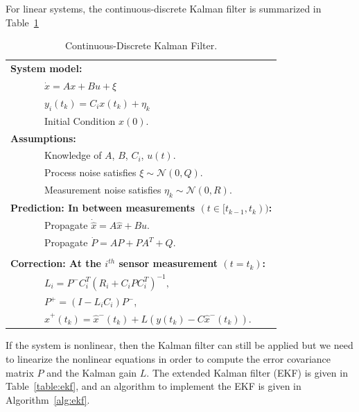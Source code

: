 {For linear systems, the continuous-discrete Kalman filter is
summarized in Table~\ref{table:kf}
\begin{table}[hhhhtb]
\begin{center}
\begin{tabular}{l}
\hline
\textbf{System model:} \\
~~~~~~~$\dot{x}=Ax+Bu + \xi$ \\
~~~~~~~$y_i(t_k)=C_ix(t_k) + \eta_k$ \\
~~~~~~~Initial Condition $x(0)$. \\
\textbf{Assumptions:} \\
~~~~~~~Knowledge of $A$, $B$, $C_i$, $u(t)$. \\
~~~~~~~Process noise satisfies $\xi\sim\mathcal{N}(0,Q)$. \\
~~~~~~~Measurement noise satisfies $\eta_k\sim\mathcal{N}(0,R)$. \\
\textbf{Prediction: In between measurements $(t\in[t_{k-1}, t_k))$:} \\
~~~~~~~Propagate $\dot{\hat{x}}=A\hat{x} + Bu$. \\
~~~~~~~Propagate $\dot{P}=AP + PA^T + Q$. \\
\\
\textbf{Correction: At the $i^{th}$ sensor measurement $(t=t_k)$:} \\
~~~~~~~$L_i = P^{-}C_i^T(R_i + C_iPC_i^T)^{-1},$ \\
~~~~~~~$P^{+} = (I-L_iC_i)P^{-}$, \\
~~~~~~~$\hat{x}^+(t_k) = \hat{x}^-(t_k) + L\left( y(t_k) - C\hat{x}^-(t_k) \right).$ \\
\hline
\end{tabular}
\end{center}
\label{table:kf} \caption{Continuous-Discrete Kalman Filter.}
\end{table}

If the system is nonlinear, then the Kalman filter can still be
applied but we need to linearize the nonlinear equations in order to
compute the error covariance matrix $P$ and the Kalman gain $L$. The
extended Kalman filter (EKF)  is given in Table~\ref{table:ekf}, and
an algorithm to implement the EKF is given in
Algorithm~\ref{alg:ekf}.


}
